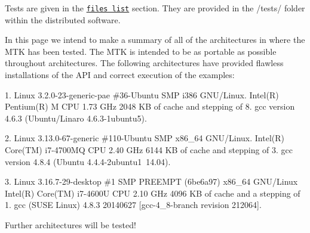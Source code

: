 Tests are given in the \href{files.html}{\tt files list} section. They are provided in the /tests/ folder within the distributed software.

In this page we intend to make a summary of all of the architectures in where the M\+T\+K has been tested. The M\+T\+K is intended to be as portable as possible throughout architectures. The following architectures have provided flawless installations of the A\+P\+I and correct execution of the examples\+:


\begin{DoxyPre}
1. Linux 3.2.0-23-generic-pae \#36-Ubuntu SMP i386 GNU/Linux.
   Intel(R) Pentium(R) M CPU 1.73 GHz 2048 KB of cache and stepping of 8.
   gcc version 4.6.3 (Ubuntu/Linaro 4.6.3-1ubuntu5).\end{DoxyPre}



\begin{DoxyPre}2. Linux 3.13.0-67-generic \#110-Ubuntu SMP x86\_64 GNU/Linux.
   Intel(R) Core(TM) i7-4700MQ CPU 2.40 GHz 6144 KB of cache and stepping of 3.
   gcc version 4.8.4 (Ubuntu 4.4.4-2ubuntu1~14.04).\end{DoxyPre}



\begin{DoxyPre}3. Linux 3.16.7-29-desktop \#1 SMP PREEMPT (6be6a97) x86\_64 GNU/Linux
   Intel(R) Core(TM) i7-4600U CPU 2.10 GHz 4096 KB of cache and a stepping of 1.
   gcc (SUSE Linux) 4.8.3 20140627 [gcc-4\_8-branch revision 212064].
\end{DoxyPre}


Further architectures will be tested! 